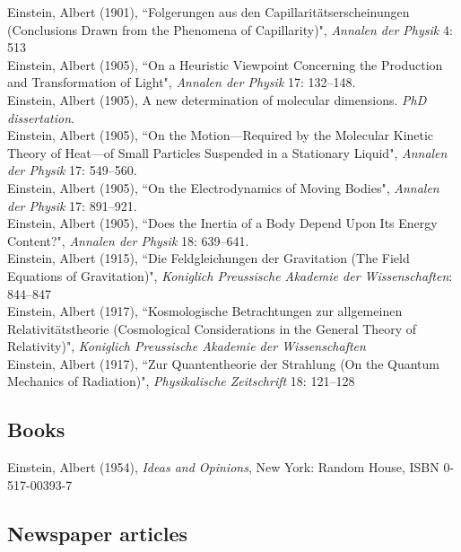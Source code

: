\documentclass[12pt]{article} %
\begin{document}
Einstein, Albert (1901), “Folgerungen aus den Capillaritätserscheinungen (Conclusions Drawn from the Phenomena of Capillarity)", \emph{Annalen der Physik} 4: 513\\
Einstein, Albert (1905), “On a Heuristic Viewpoint Concerning the Production and Transformation of Light", \emph{Annalen der Physik} 17: 132–148.\\
Einstein, Albert (1905), A new determination of molecular dimensions. \emph{PhD dissertation}.\\
Einstein, Albert (1905), “On the Motion—Required by the Molecular Kinetic Theory of Heat—of Small Particles Suspended in a Stationary Liquid", \emph{Annalen der Physik} 17: 549–560.\\
Einstein, Albert (1905), “On the Electrodynamics of Moving Bodies", \emph{Annalen der Physik} 17: 891–921.\\
Einstein, Albert (1905), “Does the Inertia of a Body Depend Upon Its Energy Content?", \emph{Annalen der Physik} 18: 639–641.\\
Einstein, Albert (1915), “Die Feldgleichungen der Gravitation (The Field Equations of Gravitation)", \emph{Koniglich Preussische Akademie der Wissenschaften}: 844–847\\
Einstein, Albert (1917), “Kosmologische Betrachtungen zur allgemeinen Relativitätstheorie (Cosmological Considerations in the General Theory of Relativity)", \emph{Koniglich Preussische Akademie der Wissenschaften}\\
Einstein, Albert (1917), “Zur Quantentheorie der Strahlung (On the Quantum Mechanics of Radiation)", \emph{Physikalische Zeitschrift} 18: 121–128


\subsection*{Books}

Einstein, Albert (1954), \emph{Ideas and Opinions}, New York: Random House, ISBN 0-517-00393-7


\subsection*{Newspaper articles}
\end{document}
